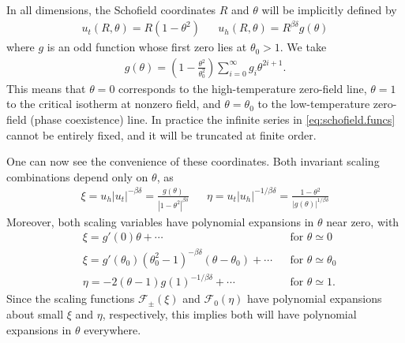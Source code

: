 \documentclass[
  aps,
  pre,
  preprint,
  longbibliography,
  floatfix
]{revtex4-2}
\begin{document}
In all dimensions, the Schofield coordinates $R$ and $\theta$ will be implicitly defined by
\begin{align} \label{eq:schofield}
  u_t(R, \theta) = R(1-\theta^2)
  &&
  u_h(R, \theta) = R^{\beta\delta}g(\theta)
\end{align}
where $g$ is an odd function whose first zero lies at $\theta_0>1$. We take
\begin{align} \label{eq:schofield.funcs}
  g(\theta)=\left(1-\frac{\theta^2}{\theta_0^2}\right)\sum_{i=0}^\infty g_i\theta^{2i+1}.
\end{align}
This means that $\theta=0$ corresponds to the high-temperature zero-field line,
$\theta=1$ to the critical isotherm at nonzero field, and $\theta=\theta_0$ to
the low-temperature zero-field (phase coexistence) line.
In practice the infinite series in \eqref{eq:schofield.funcs} cannot be
entirely fixed, and it will be truncated at finite order.

One can now see the convenience of these coordinates. Both invariant scaling
combinations depend only on $\theta$, as
\begin{align}
  \xi=u_h|u_t|^{-\beta\delta}=\frac{g(\theta)}{|1-\theta^2|^{\beta\delta}} &&
  \eta=u_t|u_h|^{-1/\beta\delta}=\frac{1-\theta^2}{|g(\theta)|^{1/\beta\delta}}
\end{align}
Moreover, both scaling variables have polynomial expansions in $\theta$ near zero, with
\begin{align}
  &\xi= g'(0)\theta+\cdots  && \text{for $\theta\simeq0$}\\
  &\xi=g'(\theta_0)(\theta_0^2-1)^{-\beta\delta}(\theta-\theta_0)+\cdots && \text{for $\theta\simeq\theta_0$}
  \\
  &\eta=-2(\theta-1)g(1)^{-1/\beta\delta}+\cdots && \text{for $\theta\simeq1$}.
\end{align}
Since the scaling functions $\mathcal F_\pm(\xi)$ and $\mathcal F_0(\eta)$ have
polynomial expansions about small $\xi$ and $\eta$, respectively, this implies
both will have polynomial expansions in $\theta$ everywhere.
\end{document}
